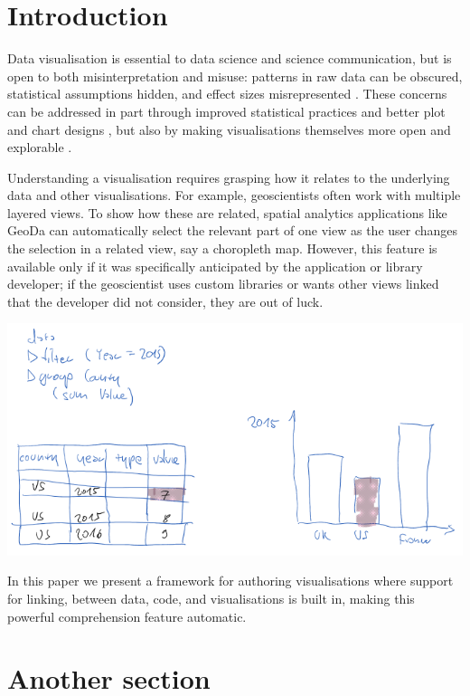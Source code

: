 \section{Introduction}

Data visualisation is essential to data science and science communication, but
is open to both misinterpretation and misuse: patterns in raw data can be
obscured, statistical assumptions hidden, and effect sizes misrepresented
\cite{weissgerber15}. These concerns can be addressed in part through improved
statistical practices and better plot and chart designs \cite{allen19}, but also
by making visualisations themselves more open and explorable
\cite{dragicevic19}.

Understanding a visualisation requires grasping how it relates to the underlying
data and other visualisations. For example, geoscientists often work with
multiple layered views. To show how these are related, spatial analytics
applications like GeoDa \cite{anselin06} can automatically select the relevant
part of one view as the user changes the selection in a related view, say a
choropleth map. However, this feature is available only if it was specifically
anticipated by the application or library developer; if the geoscientist uses
custom libraries or wants other views linked that the developer did not
consider, they are out of luck.

\includegraphics[scale=0.35]{image/chart-fwd}

In this paper we present a framework for authoring visualisations where support
for linking, between data, code, and visualisations is built in, making this
powerful comprehension feature automatic.

\section{Another section}

